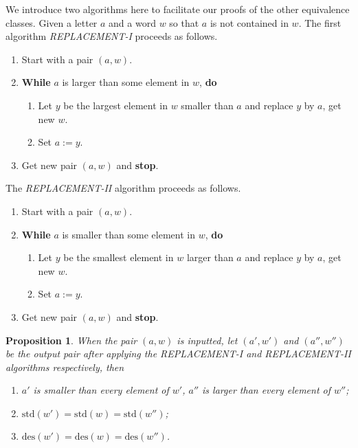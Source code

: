 \documentclass[11pt,reqno]{amsart}
\numberwithin{equation}{section}
\theoremstyle{plain}
\newtheorem{proposition}[theorem]{Proposition}
\theoremstyle{definition}
\def\des{\mathrm{des}}
\def\std{\mathrm{std}}
\begin{document}
We introduce two algorithms here to facilitate our proofs of the other equivalence classes.
Given a letter $a$ and a word $w$ so that $a$ is not contained in $w$.
The first algorithm \textit{REPLACEMENT-I} proceeds as follows.
\begin{enumerate}[label=(\arabic*)]
    \item Start with a pair $(a,w)$.
    \item \textbf{While} $a$ is larger than some element in $w$, \textbf{do} \label{Re2}
    \begin{enumerate}[label=(2.\arabic*)]
        \item Let $y$ be the largest element in $w$ smaller than $a$ and replace $y$ by $a$, get new $w$. \label{Re2.1}
        \item Set $a:=y$.
    \end{enumerate}
    \item Get new pair $(a,w)$ and \textbf{stop}.
\end{enumerate}
The \textit{REPLACEMENT-II} algorithm proceeds as follows.
\begin{enumerate}[label=(\arabic*)]
    \item Start with a pair $(a,w)$.
    \item \textbf{While} $a$ is smaller than some element in $w$, \textbf{do} \label{Re2-}
    \begin{enumerate}[label=(2.\arabic*)]
        \item Let $y$ be the smallest element in $w$ larger than $a$ and replace $y$ by $a$, get new $w$. \label{Re2.1-}
        \item Set $a:=y$.
    \end{enumerate}
    \item Get new pair $(a,w)$ and \textbf{stop}.
\end{enumerate}

\begin{proposition}
    When the pair $(a,w)$ is inputted, let $(a',w')$ and $(a'',w'')$ be the output pair after applying the \textit{REPLACEMENT-I} and \textit{REPLACEMENT-II} algorithms respectively, then 
    \begin{enumerate} 
        \item $a'$ is smaller than every element of $w'$, $a''$ is larger than every element of $w''$; 
        \item $\std(w')=\std(w)=\std(w'')$;
        \item $\des(w')=\des(w)=\des(w'')$.
    \end{enumerate}
\end{proposition}
\end{document}
